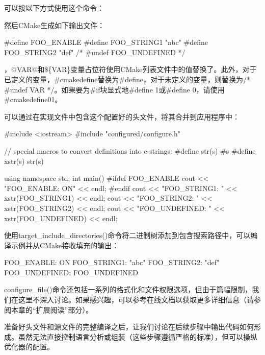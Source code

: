 可以按以下方式使用这个命令：



然后CMake生成如下输出文件：


\begin{cpp}
#define FOO_ENABLE
#define FOO_STRING1 "abc"
#define FOO_STRING2 "def"
/* #undef FOO_UNDEFINED */
\end{cpp}

，@VAR@和\$\{VAR\}变量占位符使用CMake列表文件中的值替换了。此外，对于已定义的变量，\#cmakedefine替换为\#define，对于未定义的变量，则替换为/* \#undef VAR */。如果要为\#if块显式地\#define 1或\#define 0，请使用\#cmakedefine01。

可以通过在实现文件中包含这个配置好的头文件，将其合并到应用程序中：


\begin{cpp}
#include <iostream>
#include "configured/configure.h"

// special macros to convert definitions into c-strings:
#define str(s) #s
#define xstr(s) str(s)

using namespace std;
int main()
{
#ifdef FOO_ENABLE
    cout << "FOO_ENABLE: ON" << endl;
#endif
    cout << "FOO_STRING1: " << xstr(FOO_STRING1) << endl;
    cout << "FOO_STRING2: " << xstr(FOO_STRING2) << endl;
    cout << "FOO_UNDEFINED: " << xstr(FOO_UNDEFINED) << endl;
}
\end{cpp}

使用target\_include\_directories()命令将二进制树添加到包含搜索路径中，可以编译示例并从CMake接收填充的输出：

\begin{shell}
FOO_ENABLE: ON
FOO_STRING1: "abc"
FOO_STRING2: "def"
FOO_UNDEFINED: FOO_UNDEFINED
\end{shell}

configure\_file()命令还包括一系列的格式化和文件权限选项，但由于篇幅限制，我们在这里不深入讨论。如果感兴趣，可以参考在线文档以获取更多详细信息（请参阅本章的“扩展阅读”部分）。

准备好头文件和源文件的完整编译之后，让我们讨论在后续步骤中输出代码如何形成。虽然无法直接控制语言分析或组装（这些步骤遵循严格的标准），但可以操纵优化器的配置。






